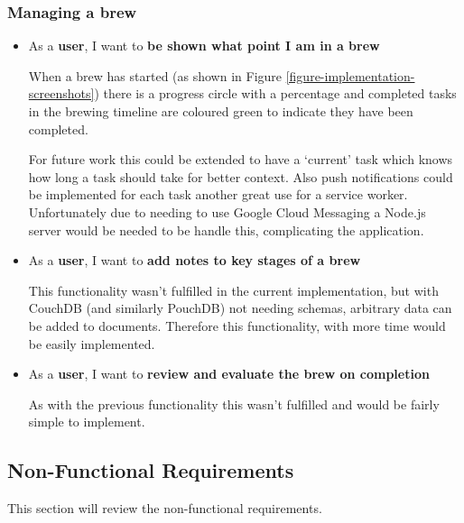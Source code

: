 \subsubsection{Managing a brew}

\begin{itemize}
  \item As a \textbf{user}, I want to \textbf{be shown what point I am in a brew}

  When a brew has started (as shown in Figure \ref{figure-implementation-screenshots}) there is a progress circle with a percentage and completed tasks in the brewing timeline are coloured green to indicate they have been completed.

  For future work this could be extended to have a `current' task which knows how long a task should take for better context. Also push notifications could be implemented for each task another great use for a service worker. Unfortunately due to needing to use Google Cloud Messaging a Node.js server would be needed to be handle this, complicating the application. \cite{google_cloud_messaging}

  \item As a \textbf{user}, I want to \textbf{add notes to key stages of a brew}

  This functionality wasn't fulfilled in the current implementation, but with CouchDB (and similarly PouchDB) not needing schemas, arbitrary data can be added to documents. Therefore this functionality, with more time would be easily implemented.

  \item As a \textbf{user}, I want to \textbf{review and evaluate the brew on completion}

  As with the previous functionality this wasn't fulfilled and would be fairly simple to implement.
\end{itemize}

\subsection{Non-Functional Requirements} \label{t-e--requirements--non-functional}

This section will review the non-functional requirements.

